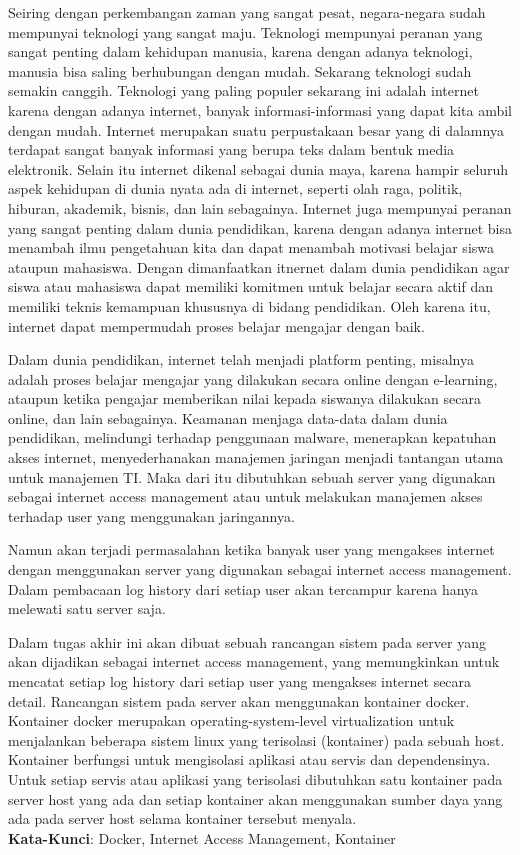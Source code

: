 \begin{abstrak}
Seiring dengan perkembangan zaman yang sangat pesat, negara-negara sudah mempunyai teknologi yang sangat maju. Teknologi mempunyai peranan yang sangat penting dalam kehidupan manusia, karena dengan adanya teknologi, manusia bisa saling berhubungan dengan mudah. Sekarang teknologi sudah semakin canggih. Teknologi yang paling populer sekarang ini adalah internet karena dengan adanya internet, banyak informasi-informasi yang dapat kita ambil dengan mudah. Internet merupakan suatu perpustakaan besar yang di dalamnya terdapat sangat banyak informasi yang berupa teks dalam bentuk media elektronik. Selain itu internet dikenal sebagai dunia maya, karena hampir seluruh aspek kehidupan di dunia nyata ada di internet, seperti olah raga, politik, hiburan, akademik, bisnis, dan lain sebagainya. Internet juga mempunyai peranan yang sangat penting dalam dunia pendidikan, karena dengan adanya internet bisa menambah ilmu pengetahuan kita dan dapat menambah motivasi belajar siswa ataupun mahasiswa. Dengan dimanfaatkan itnernet dalam dunia pendidikan agar siswa atau mahasiswa dapat memiliki komitmen untuk belajar secara aktif dan memiliki teknis kemampuan khususnya di bidang pendidikan. Oleh karena itu, internet dapat mempermudah proses belajar mengajar dengan baik.

Dalam dunia pendidikan, internet telah menjadi platform penting, misalnya adalah proses belajar mengajar yang dilakukan secara online dengan e-learning, ataupun ketika pengajar memberikan nilai kepada siswanya dilakukan secara online, dan lain sebagainya. Keamanan menjaga data-data dalam dunia pendidikan, melindungi terhadap penggunaan malware, menerapkan kepatuhan akses internet, menyederhanakan manajemen jaringan menjadi tantangan utama untuk manajemen TI. Maka dari itu dibutuhkan sebuah server yang digunakan sebagai internet access management atau untuk melakukan manajemen akses terhadap user yang menggunakan jaringannya.

Namun akan terjadi permasalahan ketika banyak user yang mengakses internet dengan menggunakan server yang digunakan sebagai internet access management. Dalam pembacaan log history dari setiap user akan tercampur karena hanya melewati satu server saja. 

Dalam tugas akhir ini akan dibuat sebuah rancangan sistem pada server yang akan dijadikan sebagai internet access management, yang memungkinkan untuk mencatat setiap log history dari setiap user yang mengakses internet secara detail. Rancangan sistem pada server akan menggunakan kontainer docker. Kontainer docker merupakan operating-system-level virtualization untuk menjalankan beberapa sistem linux yang terisolasi (kontainer) pada sebuah host. Kontainer berfungsi untuk mengisolasi aplikasi atau servis dan dependensinya. Untuk setiap servis atau aplikasi yang terisolasi dibutuhkan satu kontainer pada server host yang ada dan setiap kontainer akan menggunakan sumber daya yang ada pada server host selama kontainer tersebut menyala.\\

	\noindent \textbf{Kata-Kunci}: Docker, Internet Access Management, Kontainer
\end{abstrak}
